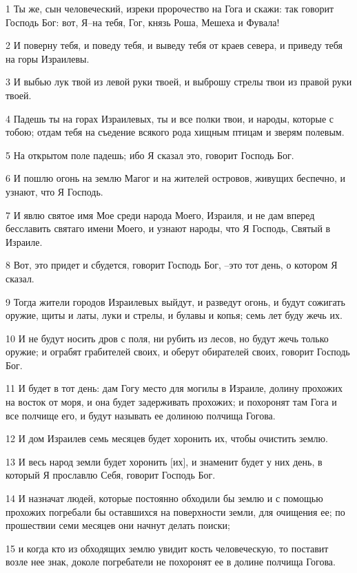 \par 1 Ты же, сын человеческий, изреки пророчество на Гога и скажи: так говорит Господь Бог: вот, Я--на тебя, Гог, князь Роша, Мешеха и Фувала!
\par 2 И поверну тебя, и поведу тебя, и выведу тебя от краев севера, и приведу тебя на горы Израилевы.
\par 3 И выбью лук твой из левой руки твоей, и выброшу стрелы твои из правой руки твоей.
\par 4 Падешь ты на горах Израилевых, ты и все полки твои, и народы, которые с тобою; отдам тебя на съедение всякого рода хищным птицам и зверям полевым.
\par 5 На открытом поле падешь; ибо Я сказал это, говорит Господь Бог.
\par 6 И пошлю огонь на землю Магог и на жителей островов, живущих беспечно, и узнают, что Я Господь.
\par 7 И явлю святое имя Мое среди народа Моего, Израиля, и не дам вперед бесславить святаго имени Моего, и узнают народы, что Я Господь, Святый в Израиле.
\par 8 Вот, это придет и сбудется, говорит Господь Бог, --это тот день, о котором Я сказал.
\par 9 Тогда жители городов Израилевых выйдут, и разведут огонь, и будут сожигать оружие, щиты и латы, луки и стрелы, и булавы и копья; семь лет буду жечь их.
\par 10 И не будут носить дров с поля, ни рубить из лесов, но будут жечь только оружие; и ограбят грабителей своих, и оберут обирателей своих, говорит Господь Бог.
\par 11 И будет в тот день: дам Гогу место для могилы в Израиле, долину прохожих на восток от моря, и она будет задерживать прохожих; и похоронят там Гога и все полчище его, и будут называть ее долиною полчища Гогова.
\par 12 И дом Израилев семь месяцев будет хоронить их, чтобы очистить землю.
\par 13 И весь народ земли будет хоронить [их], и знаменит будет у них день, в который Я прославлю Себя, говорит Господь Бог.
\par 14 И назначат людей, которые постоянно обходили бы землю и с помощью прохожих погребали бы оставшихся на поверхности земли, для очищения ее; по прошествии семи месяцев они начнут делать поиски;
\par 15 и когда кто из обходящих землю увидит кость человеческую, то поставит возле нее знак, доколе погребатели не похоронят ее в долине полчища Гогова.
